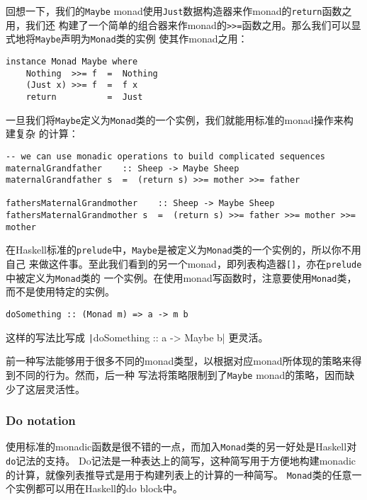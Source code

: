 \indent{}回想一下，我们的\texttt{Maybe} monad使用\texttt{Just}数据构造器来作monad的\texttt{return}函数之用，我们还
构建了一个简单的组合器来作monad的\texttt{>>=}函数之用。那么我们可以显式地将\texttt{Maybe}声明为\texttt{Monad}类的实例
使其作monad之用：
\begin{verbatim}
instance Monad Maybe where
    Nothing  >>= f  =  Nothing
    (Just x) >>= f  =  f x
    return          =  Just
\end{verbatim}
\noindent{}一旦我们将\texttt{Maybe}定义为\texttt{Monad}类的一个实例，我们就能用标准的monad操作来构建复杂
的计算：
\begin{verbatim}
-- we can use monadic operations to build complicated sequences
maternalGrandfather    :: Sheep -> Maybe Sheep
maternalGrandfather s  =  (return s) >>= mother >>= father

fathersMaternalGrandmother    :: Sheep -> Maybe Sheep
fathersMaternalGrandmother s  =  (return s) >>= father >>= mother >>= mother
\end{verbatim}
\indent{}在Haskell标准的\texttt{prelude}中，\texttt{Maybe}是被定义为\texttt{Monad}类的一个实例的，所以你不用自己
来做这件事。至此我们看到的另一个monad，即列表构造器\texttt{[]}，亦在\texttt{prelude}中被定义为\texttt{Monad}类的
一个实例。在使用monad写函数时，注意要使用\texttt{Monad}类，而不是使用特定的实例。
\begin{verbatim}
doSomething :: (Monad m) => a -> m b
\end{verbatim}
\noindent{}这样的写法比写成 \texttt|doSomething :: a -> Maybe b| 更灵活。

\indent{}前一种写法能够用于很多不同的monad类型，以根据对应monad所体现的策略来得到不同的行为。然而，后一种
写法将策略限制到了\texttt{Maybe} monad的策略，因而缺少了这层灵活性。

\subsubsection{Do notation}
\indent{}使用标准的monadic函数是很不错的一点，而加入\texttt{Monad}类的另一好处是Haskell对\texttt{do}记法的支持。
Do记法是一种表达上的简写，这种简写用于方便地构建monadic的计算，就像列表推导式是用于构建列表上的计算的一种简写。
\texttt{Monad}类的任意一个实例都可以用在Haskell的do block中。


